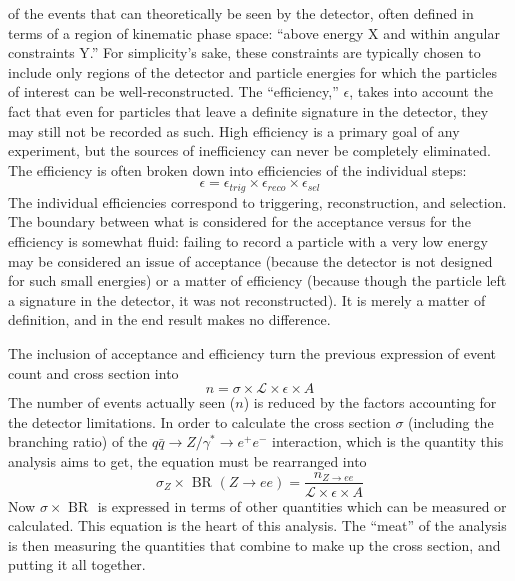 of the events that can theoretically 
be seen by the detector, %
often defined in terms of %
a region of kinematic phase space: %
``above energy X and within angular constraints Y.''
For simplicity's sake, 
these constraints are typically chosen to include 
only regions of the detector 
and particle energies 
for which the particles of interest can be well-reconstructed.  
The ``efficiency,'' $\epsilon$, 
takes into account the fact that 
even for particles that leave a definite 
signature in the detector, 
they may still not be recorded as such.  
High efficiency is a primary goal of any 
experiment, 
but the sources of inefficiency can never be 
completely eliminated.  
The efficiency is often broken down into 
efficiencies of the individual steps: 
\[
\epsilon = \epsilon_{ trig } \times \epsilon_{ reco } \times \epsilon_{ sel }
\]
The individual efficiencies correspond to 
triggering, reconstruction, and selection.  %
The boundary between what is considered 
for the acceptance versus for the efficiency 
is somewhat fluid: 
failing to record a particle 
with a very low energy may be 
considered an issue of acceptance 
(because the detector is not designed 
for such small energies) 
or a matter of efficiency 
(because though the particle left 
a signature in the detector, 
it was not reconstructed).  
It is merely a matter of definition, 
and in the end result makes no difference.  

The inclusion of acceptance and efficiency 
turn the previous expression 
of event count and cross section into 
\[
n = \sigma \times \mathcal{ L } \times \epsilon \times A
\]
The number of events actually seen ($n$) is reduced 
by the factors accounting for the detector limitations.  
In order to calculate the cross section $\sigma$ 
(including the branching ratio) 
of the 
$ q\bar{q} \rightarrow Z/ \gamma^{*} \rightarrow e^{+} e^{-} $ 
interaction, 
which is the quantity this analysis aims to get, 
the equation must be rearranged into 
\[
\sigma_{ Z } \times \textrm{ BR }( Z \rightarrow ee ) = \frac{ n_{ Z \rightarrow ee } }{ \mathcal{ L } \times \epsilon \times A}
\]
Now $\sigma \times \textrm{ BR }$ is expressed 
in terms of other quantities which 
can be measured or calculated.  
This equation is the heart of this analysis.  
The ``meat'' of the analysis is then 
measuring the quantities that combine to 
make up the cross section, 
and putting it all together.  


